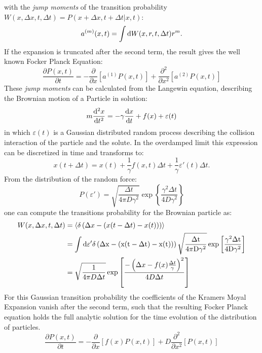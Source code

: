 with the {\it jump moments} of the transition probability $W(x,\Delta x,t, \Delta t) = P(x+\Delta x,t+\Delta t | x, t)$:
\begin{equation}
    a^{(m)}(x,t) = \int {\rm d} W(x,r,t, \Delta t) r^m .
    \label{jump moments}
\end{equation}
If the expansion is truncated after the second term, the result gives the well known Focker Planck Equation:
\begin{equation}
    \frac{\partial P(x,t)}{\partial t} = - \frac{\partial}{\partial x} \left[a^{(1)}P(x,t) \right] + \frac{\partial^2}{\partial x^2}\left[ a^{(2)}P(x,t) \right] 
    \label{FPE}
\end{equation}
These {\it jump moments} can be calculated from the Langewin equation, describing the 
Brownian motion of a Particle in solution:
\begin{equation}
    m \frac{{\rm d}^2 x}{{\rm d}t^2} = -\gamma \frac{ {\rm d}x}{{\rm d}t} + f(x) + \varepsilon(t)
    \label{Langewin equation}
\end{equation}
in which $\varepsilon(t)$ is a Gaussian distributed random process describing the 
collision interaction of the particle and the solute. 
In the overdamped limit this expression can be discretized in time and transforms to:
\begin{equation}
        x(t + \Delta t) = x(t) + \frac{1}{\gamma}f(x,t) \Delta t + \frac{1}{\gamma} \varepsilon'(t) \Delta t.
    \label{overdamped limit}
\end{equation}
From the distribution of the random force:
\begin{equation}
    P(\varepsilon ' ) = \sqrt{\frac{\Delta t}{4 \pi D \gamma^{2}}} \exp \left\{ \frac{\gamma^{2} \Delta t}{4 D \gamma^{2}} \right\}
    \label{eps dist}
\end{equation}
one can compute the transitions probability for the Brownian particle as:
\begin{align}
    W(x,\Delta x,t, \Delta t)  &= \left< \delta \left(  \Delta x - (x(t-\Delta t) - x(t)) \right)\right> \\
                        &= \int \rm{d}\varepsilon ' \delta \left(  \Delta x - (x(t-\Delta t) - x(t)) \right)  \sqrt{\frac{\Delta t}{4 \pi D \gamma^{2}}} \exp \left[ \frac{\gamma^{2} \Delta t}{4 D \gamma^{2}} \right] \\
                        &= \sqrt{\frac{1}{4 \pi D \Delta t}} \exp \left[ \frac{-\left(\Delta x - f(x) \frac{\Delta t}{\gamma} \right)^2}{4 D \Delta t} \right]
    \label{W}
\end{align}
For this Gaussian transition probability the coefficients of the Kramers Moyal Expansion vanish after the second term, such that the resulting Focker Planck equation holds the full analytic solution for the time evolution of the distribution of particles.
\begin{equation}
    \frac{\partial P(x,t)}{\partial t} = - \frac{\partial}{\partial x} \left[f(x)P(x,t) \right] + D\frac{\partial^2}{\partial x^2}\left[P(x,t) \right] 
    \label{FPE2}
\end{equation}

